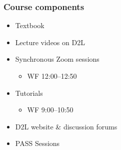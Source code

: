 

 
\setcounter{section}{0}

{
\maketitle}

\begin{frame}
  \frametitle{Course components}

  \begin{itemize}[<+->]
  \item Textbook
  \item Lecture videos on D2L
  \item Synchronous Zoom sessions
  \begin{itemize}
    \item WF 12:00--12:50
  \end{itemize}
  \item Tutorials
  \begin{itemize}
    \item WF 9:00--10:50
  \end{itemize}
  \item D2L website \& discussion forums
  \item PASS Sessions
  \end{itemize}
\end{frame}

